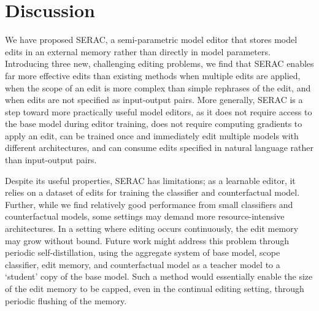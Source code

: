 \documentclass{article}
\newcommand{\name}{SERAC}
\begin{document}


\section{Discussion}

We have proposed {\name}, a semi-parametric model editor that stores model edits in an external memory rather than directly in model parameters. Introducing three new, challenging editing problems, we find that {\name} enables far more effective edits than existing methods when multiple edits are applied, when the scope of an edit is more complex than simple rephrases of the edit, and when edits are not specified as input-output pairs. More generally, {\name} is a step toward more practically useful model editors, as it does not require access to the base model during editor training, does not require computing gradients to apply an edit, can be trained once and immediately edit multiple models with different architectures, and can consume edits specified in natural language rather than input-output pairs.

Despite its useful properties, {\name} has limitations; as a learnable editor, it relies on a dataset of edits for training the classifier and counterfactual model. Further, while we find relatively good performance from small classifiers and counterfactual models, some settings may demand more resource-intensive architectures. In a setting where editing occurs continuously, the edit memory may grow without bound. Future work might address this problem through periodic self-distillation, using the aggregate system of base model, scope classifier, edit memory, and counterfactual model as a teacher model to a `student' copy of the base model. Such a method would essentially enable the size of the edit memory to be capped, even in the continual editing setting, through periodic flushing of the memory.
\end{document}
